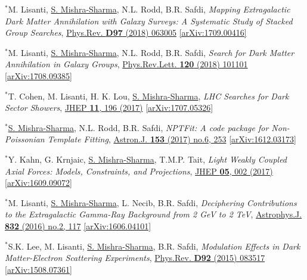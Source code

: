 \documentclass[letterpaper,11pt]{article}
\newenvironment{packed_enumerate}[1][]{
\begin{etaremune}[#1]
  \setlength{\itemsep}{3.7pt}
  \setlength{\parskip}{0pt}
  \setlength{\parsep}{0pt}}{\end{etaremune}
}
\begin{document}
\begin{packed_enumerate}[start=38]
  \item $^*$M. Lisanti, \underline{S. Mishra-Sharma}, N.L. Rodd, B.R. Safdi, \emph{Mapping Extragalactic Dark Matter Annihilation with Galaxy Surveys: A Systematic Study of Stacked Group Searches},  \href{https://journals.aps.org/prd/abstract/10.1103/PhysRevD.97.063005}{Phys.Rev. \textbf{D97} (2018) 063005} \href{https://arxiv.org/abs/1709.00416}{[arXiv:1709.00416]}

  \item $^*$M. Lisanti, \underline{S. Mishra-Sharma}, N.L. Rodd, B.R. Safdi, \emph{Search for Dark Matter Annihilation in Galaxy Groups},  \href{https://journals.aps.org/prl/abstract/10.1103/PhysRevLett.120.101101}{Phys.Rev.Lett. \textbf{120} (2018) 101101} \href{https://arxiv.org/abs/1708.09385}{[arXiv:1708.09385]}

  \item $^*$T. Cohen, M. Lisanti, H. K. Lou, \underline{S. Mishra-Sharma}, \emph{LHC Searches for Dark Sector Showers},  \href{https://link.springer.com/article/10.1007/JHEP11(2017)196}{JHEP \textbf{11}, 196 (2017)}  \href{https://arxiv.org/abs/1707.05326}{ [arXiv:1707.05326]}

  \item $^*$\underline{S. Mishra-Sharma}, N.L. Rodd, B.R. Safdi, \emph{NPTFit: A code package for Non-Poissonian Template Fitting},  \href{http://iopscience.iop.org/article/10.3847/1538-3881/aa6d5f/meta}{Astron.J. \textbf{153} (2017) no.6, 253}  \href{https://arxiv.org/abs/1612.03173}{ [arXiv:1612.03173]}

  \item $^*$Y. Kahn, G. Krnjaic, \underline{S. Mishra-Sharma}, T.M.P. Tait, \emph{Light Weakly Coupled Axial Forces: Models, Constraints, and Projections},  \href{https://link.springer.com/article/10.1007%2FJHEP05%282017%29002}{JHEP \textbf{05}, 002 (2017)}  \href{https://arxiv.org/abs/1609.09072}{[arXiv:1609.09072]}

  \item $^*$M. Lisanti, \underline{S. Mishra-Sharma}, L. Necib, B.R. Safdi, \emph{Deciphering Contributions to the Extragalactic Gamma-Ray Background from 2 GeV to 2 TeV},  \href{http://iopscience.iop.org/article/10.3847/0004-637X/832/2/117/meta}{Astrophys.J. \textbf{832} (2016) no.2, 117} \href{https://arxiv.org/abs/1606.04101}{[arXiv:1606.04101]}

  \item $^*$S.K. Lee, M. Lisanti, \underline{S. Mishra-Sharma}, B.R. Safdi, \emph{Modulation Effects in Dark Matter-Electron Scattering Experiments}, \href{https://journals.aps.org/prd/abstract/10.1103/PhysRevD.92.083517}{Phys.Rev. \textbf{D92} (2015) 083517} \href{https://arxiv.org/abs/1508.07361}{[arXiv:1508.07361]}
\end{packed_enumerate}
\end{document}
